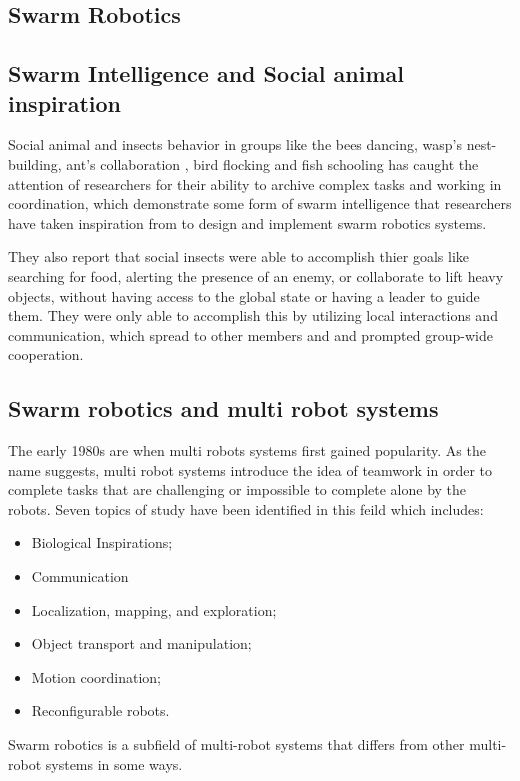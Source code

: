\documentclass[12pt]{article}
\begin{document}
\newpage
\pagebreak
\hspace{0pt}
\vfill
\begin{center}
\section{Swarm Robotics}
\end{center}
\vfill
\hspace{0pt}
\pagebreak




                  
\subsection{Swarm Intelligence and Social animal inspiration}
Social animal and insects behavior in groups like the bees dancing, wasp’s nest-building, ant's collaboration , bird flocking and fish schooling  has caught the attention of researchers for their ability to archive complex tasks and working in coordination, which demonstrate some form of swarm intelligence  that researchers have taken inspiration from to design and implement swarm robotics systems.\cite{navarro2013introduction} 

They also report that social insects were able to accomplish thier goals like searching for food, alerting the presence of an enemy, or collaborate to lift heavy objects, without having access to the global state or having a leader to guide them. They were only able to accomplish this by utilizing local interactions and communication, which spread to other members and and prompted group-wide cooperation.\cite{navarro2013introduction} 



\subsection{Swarm robotics and multi robot systems}
The early 1980s are when multi robots systems first gained popularity.
As the name suggests, multi robot systems introduce the idea of teamwork in order to complete tasks that are challenging or impossible to complete alone by the robots.
Seven topics of study have been identified in this feild which includes:
\begin{itemize}
  \item  Biological Inspirations; 
  \item Communication
  \item Localization, mapping, and exploration;
  \item Object transport and manipulation;
  \item Motion coordination; 
  \item Reconfigurable robots.
\end{itemize}
Swarm robotics is a subfield of multi-robot systems that differs from other multi-robot systems in some ways.\cite{arai2002advances}
   
\end{document}
